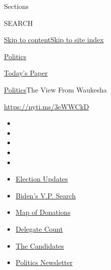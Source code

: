 Sections

SEARCH

\protect\hyperlink{site-content}{Skip to
content}\protect\hyperlink{site-index}{Skip to site index}

\href{https://www.nytimes.com/section/politics}{Politics}

\href{https://myaccount.nytimes.com/auth/login?response_type=cookie\&client_id=vi}{}

\href{https://www.nytimes.com/section/todayspaper}{Today's Paper}

\href{/section/politics}{Politics}\textbar{}The View From Waukesha

\url{https://nyti.ms/3eWWCkD}

\begin{itemize}
\item
\item
\item
\item
\item
\end{itemize}

\begin{itemize}
\item
  \href{https://www.nytimes.com/2020/07/31/us/elections/biden-vs-trump.html?action=click\&pgtype=Article\&state=default\&region=TOP_BANNER\&context=storylines_menu}{Election
  Updates}
\item
  \href{https://www.nytimes.com/article/biden-vice-president-2020.html?action=click\&pgtype=Article\&state=default\&region=TOP_BANNER\&context=storylines_menu}{Biden's
  V.P. Search}
\item
  \href{https://www.nytimes.com/interactive/2020/07/24/us/politics/trump-biden-campaign-donors.html?action=click\&pgtype=Article\&state=default\&region=TOP_BANNER\&context=storylines_menu}{Map
  of Donations}
\item
  \href{https://www.nytimes.com/interactive/2020/us/elections/delegate-count-primary-results.html?action=click\&pgtype=Article\&state=default\&region=TOP_BANNER\&context=storylines_menu}{Delegate
  Count}
\item
  \href{https://www.nytimes.com/interactive/2019/us/politics/2020-presidential-candidates.html?action=click\&pgtype=Article\&state=default\&region=TOP_BANNER\&context=storylines_menu}{The
  Candidates}
\item
  \href{https://www.nytimes.com/newsletters/politics?action=click\&pgtype=Article\&state=default\&region=TOP_BANNER\&context=storylines_menu}{Politics
  Newsletter}
\end{itemize}

